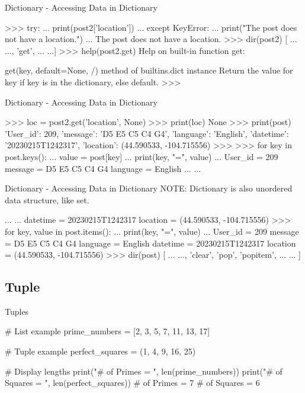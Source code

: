 \documentclass{beamer}
\begin{document}
\begin{frame}[fragile]{Dictionary - Accessing Data in Dictionary}
\begin{pythoncode}
>>> try:
...     print(post2['location'])
... except KeyError:
...     print("The post does not have a location.")
...
The post does not have a location.
>>> dir(post2)
[ ... ..., 'get', ... ...]
>>> help(post2.get)
Help on built-in function get:

get(key, default=None, /) method of builtins.dict instance
    Return the value for key if key is in the dictionary, else default.
>>> 
\end{pythoncode}
\end{frame}

\begin{frame}[fragile]{Dictionary - Accessing Data in Dictionary}
\begin{pythoncode}
>>> loc = post2.get('location', None)
>>> print(loc)
None
>>> print(post)
{'User_id': 209, 'message': 'D5 E5 C5 C4 G4', 'language': 'English', 
 'datetime': '20230215T1242317', 'location': (44.590533, -104.715556)}
>>>
>>> for key in post.keys():
...     value = post[key]
...     print(key, "=", value)
...
User_id = 209
message = D5 E5 C5 C4 G4
language = English
... ...
\end{pythoncode}
\end{frame}

\begin{frame}[fragile]{Dictionary - Accessing Data in Dictionary}
NOTE: Dictionary is also unordered data structure, like set.
\begin{pythoncode}
... ...
datetime = 20230215T1242317
location = (44.590533, -104.715556)
>>> for key, value in post.items():
...     print(key, "=", value)
...
User_id = 209
message = D5 E5 C5 C4 G4
language = English
datetime = 20230215T1242317
location = (44.590533, -104.715556)
>>> dir(post)
[ ... ..., 'clear', 'pop', 'popitem', ... ... ]
\end{pythoncode}
\end{frame}

\subsection{Tuple}

\begin{frame}[fragile]{Tuples}
\begin{pythoncode}
# List example
prime_numbers = [2, 3, 5, 7, 11, 13, 17]

# Tuple example
perfect_squares = (1, 4, 9, 16, 25)

# Display lengths
print("# of Primes = ", len(prime_numbers))
print("# of Squares = ", len(perfect_squares))
# of Primes = 7
# of Squares = 6
\end{pythoncode}
\end{frame}
\end{document}
